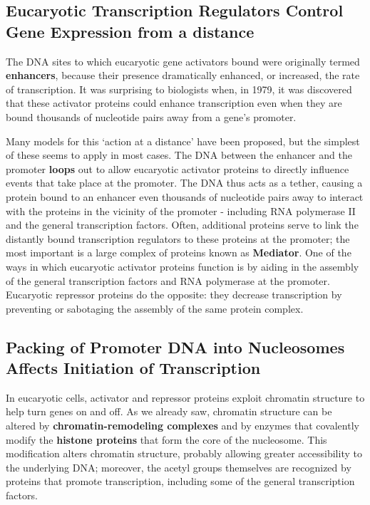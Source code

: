 \subsection{Eucaryotic Transcription Regulators Control Gene Expression from a distance}

The DNA sites to which eucaryotic gene activators bound were originally termed \textbf{enhancers},
because their presence dramatically enhanced, or increased, the rate of
transcription. It was surprising to biologists when, in 1979, it was discovered
that these activator proteins could enhance transcription even when
they are bound thousands of nucleotide pairs away from a gene’s promoter.

Many models for this ‘action at a distance’ have been proposed, but
the simplest of these seems to apply in most cases. The DNA between
the enhancer and the promoter \textbf{loops} out to allow eucaryotic activator
proteins to directly influence events that take place at the promoter.
The DNA thus acts as a tether, causing a protein bound to
an enhancer even thousands of nucleotide pairs away to interact with
the proteins in the vicinity of the promoter - including RNA polymerase
II and the general transcription factors. Often, additional proteins serve
to link the distantly bound transcription regulators
to these proteins at the promoter; the most important is a large complex
of proteins known as \textbf{Mediator}. One of the ways in
which eucaryotic activator proteins function is by aiding in the assembly
of the general transcription factors and RNA polymerase at the promoter.
Eucaryotic repressor proteins do the opposite: they decrease transcription
by preventing or sabotaging the assembly of the same protein complex.

\subsection{Packing of Promoter DNA into Nucleosomes Affects Initiation of Transcription}

In eucaryotic cells, activator and repressor proteins exploit chromatin
structure to help turn genes on and off. As we already saw, chromatin
structure can be altered by \textbf{chromatin-remodeling complexes} and by
enzymes that covalently modify the \textbf{histone proteins} that form the core
of the nucleosome. This modification alters chromatin structure,
probably allowing greater accessibility to the underlying DNA; moreover,
the acetyl groups themselves are recognized by proteins that promote
transcription, including some of the general transcription factors.

